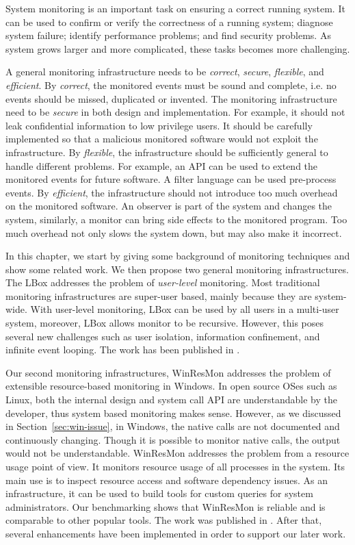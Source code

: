 System monitoring is an important task on ensuring a correct running
system.
It can be used to confirm or verify the correctness of a running system;
diagnose system failure;
identify performance problems;
and find security problems.
As system grows larger and more complicated, these tasks becomes more challenging.

A general monitoring infrastructure needs to be
{\em correct}, {\em secure}, {\em flexible}, and {\em efficient}.
By {\em correct}, the monitored events must be sound and complete, i.e.
no events should be missed, duplicated or invented.
The monitoring infrastructure need to be {\em secure} in both design and implementation.
For example, it should not leak confidential information to low privilege users.
It should be carefully implemented so that a malicious monitored
software would not exploit the infrastructure.
By {\em flexible}, the infrastructure should be sufficiently general to
handle different problems.
For example, an API can be used to extend the monitored events for future software.
A filter language can be used pre-process events.
By {\em efficient}, the infrastructure should not introduce too much
overhead on the monitored software.
An observer is part of the system and changes the system, similarly,
a monitor can bring side effects to the monitored program.
Too much overhead not only slows the system down, but may also make
it incorrect.

In this chapter, we start by giving some background of monitoring techniques
and show some related work.
We then propose two general monitoring infrastructures.
The LBox addresses the problem of {\em user-level} monitoring.
Most traditional monitoring infrastructures are super-user based,
mainly because they are system-wide.
With user-level monitoring, LBox can be used by all users in a multi-user
system, moreover, LBox allows monitor to be recursive.
However, this poses several new challenges such as
user isolation, information confinement, and infinite event looping.
The work has been published in \cite{wu2005user}.

Our second monitoring infrastructures, WinResMon addresses the problem
of extensible resource-based monitoring in Windows.
In open source OSes such as Linux,
both the internal design and system call API are understandable by
the developer, thus system based monitoring makes sense.
However, as we discussed in Section~\ref{sec:win-issue},
in Windows, the native calls are not documented and continuously
changing.
Though it is possible to monitor native calls, the output would not be
understandable.
WinResMon addresses the problem from a resource usage point of view.
It monitors resource usage of all processes in the system.
Its main use is to inspect resource access and software dependency issues.
As an infrastructure, it can be used to build tools for custom queries
for system administrators.
Our benchmarking shows that WinResMon is reliable and is
comparable to other popular tools.
The work was published in \cite{ramnath2006winresmon}.
After that, several enhancements have been implemented in order to support
our later work.
